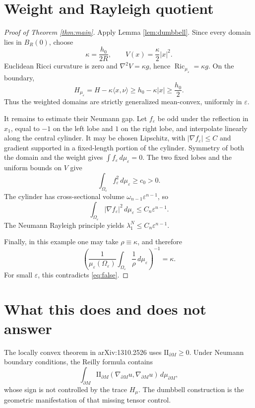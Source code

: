 \documentclass[11pt]{article}
\newcommand{\Ric}{\operatorname{Ric}}
\begin{document}
\section{Weight and Rayleigh quotient}

\begin{proof}[Proof of Theorem \ref{thm:main}]
Apply Lemma \ref{lem:dumbbell}.  Since every domain lies in $B_R(0)$, choose
\[
 \kappa=\frac{h_0}{2R},\qquad V(x)=\frac\kappa2|x|^2.
\]
Euclidean Ricci curvature is zero and $\nabla^2V=\kappa g$, hence
$\Ric_{\mu_\varepsilon}=\kappa g$.  On the boundary,
\[
 H_{\mu_\varepsilon}
 =H-\kappa\langle x,\nu\rangle
 \geq h_0-\kappa|x|
 \geq \frac{h_0}{2}.
\]
Thus the weighted domains are strictly generalized mean-convex, uniformly in
$\varepsilon$.

It remains to estimate their Neumann gap.  Let $f_\varepsilon$ be odd under
the reflection in $x_1$, equal to $-1$ on the left lobe and $1$ on the right
lobe, and interpolate linearly along the central cylinder.  It may be chosen
Lipschitz, with $|\nabla f_\varepsilon|\leq C$ and gradient supported in a
fixed-length portion of the cylinder.  Symmetry of both the domain and the
weight gives $\int f_\varepsilon\,d\mu_\varepsilon=0$.  The two fixed lobes
and the uniform bounds on $V$ give
\[
 \int_{\Omega_\varepsilon}f_\varepsilon^2\,d\mu_\varepsilon\geq c_0>0.
\]
The cylinder has cross-sectional volume $\omega_{n-1}\varepsilon^{n-1}$, so
\[
 \int_{\Omega_\varepsilon}|\nabla f_\varepsilon|^2\,d\mu_\varepsilon
 \leq C_n\varepsilon^{n-1}.
\]
The Neumann Rayleigh principle yields
$\lambda_1^N\leq C_n\varepsilon^{n-1}$.

Finally, in this example one may take $\rho\equiv\kappa$, and therefore
\[
 \left(\frac1{\mu_\varepsilon(\Omega_\varepsilon)}
 \int_{\Omega_\varepsilon}\frac1\rho\,d\mu_\varepsilon\right)^{-1}
 =\kappa.
\]
For small $\varepsilon$, this contradicts \eqref{eq:false}.
\end{proof}

\section{What this does and does not answer}

The locally convex theorem in arXiv:1310.2526 uses
$\mathrm{II}_{\partial M}\geq0$.  Under Neumann boundary conditions, the
Reilly formula contains
\[
 \int_{\partial M}\mathrm{II}_{\partial M}
   (\nabla_{\partial M}u,\nabla_{\partial M}u)\,d\mu_{\partial M},
\]
whose sign is not controlled by the trace $H_\mu$.  The dumbbell construction
is the geometric manifestation of that missing tensor control.
\end{document}
